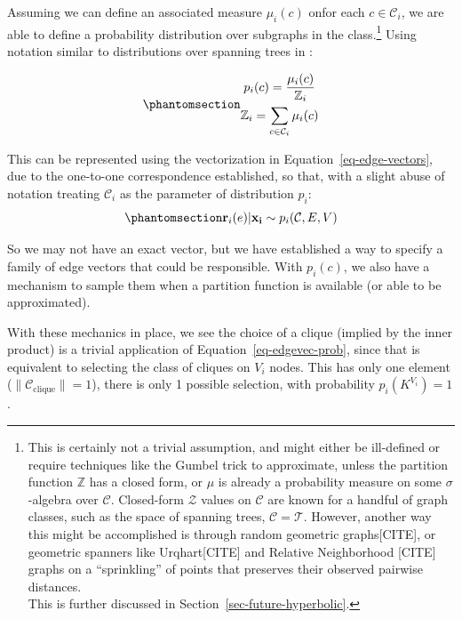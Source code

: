 \documentclass[%
	12pt,
		oneside,
		letterpaper
]{book}
\begin{document}
Assuming we can define an associated measure \(\mu_i(c)\) onfor each
\(c\in\mathcal{C}_i\), we are able to define a probability distribution
over subgraphs in the class.\footnote{ This is certainly not a trivial
  assumption, and might either be ill-defined or require techniques like
  the Gumbel trick\autocite{GradientEstimationStochastic_Paulus2020} to
  approximate, unless the partition function \(\mathbb{Z}\) has a closed
  form, or \(\mu\) is already a probability measure on some
  \(\sigma\)-algebra over \(\mathcal{C}\). Closed-form \(\mathcal{Z}\)
  values on \(\mathcal{C}\) are known for a handful of graph classes,
  such as the space of spanning trees, \(\mathcal{C}=\mathcal{T}\).
  However, another way this might be accomplished is through random
  geometric graphs{[}CITE{]}, or geometric spanners like
  Urqhart{[}CITE{]} and Relative Neighborhood {[}CITE{]} graphs on a
  ``sprinkling'' of points that preserves their observed pairwise
  distances.\\
  This is further discussed in Section~\ref{sec-future-hyperbolic}.}
Using notation similar to distributions over spanning trees in
\textcite{EfficientComputationExpectations_Zmigrod2021}:

\begin{equation}\phantomsection\label{eq-subgraph-prob}{
\begin{gathered}
p_i(c) = \frac{\mu_i(c)}{\mathbb{Z}_i}\\
\mathbb{Z}_i = \sum_{c\in\mathcal{C}_i} \mu_i(c)
\end{gathered}
}\end{equation}

This can be represented using the vectorization in
Equation~\ref{eq-edge-vectors}, due to the one-to-one correspondence
established, so that, with a slight abuse of notation treating
\(\mathcal{C}_i\) as the parameter of distribution \(p_i\):
\begin{equation}\phantomsection\label{eq-edgevec-prob}{
\mathbf{r}_{i}(e)|\mathbf{x_i} \sim p_i(\mathcal{C},E,V)
}\end{equation}

So we may not have an exact vector, but we have established a way to
specify a family of edge vectors that could be responsible. With
\(p_i(c)\), we also have a mechanism to sample them when a partition
function is available (or able to be approximated).

With these mechanics in place, we see the choice of a clique (implied by
the inner product) is a trivial application of
Equation~\ref{eq-edgevec-prob}, since that is equivalent to selecting
the class of cliques on \(V_i\) nodes. This has only one element
(\(\|\mathcal{C}_{\text{clique}}\|=1\)), there is only 1 possible
selection, with probability \(p_i(K^{V_i})=1\).
\end{document}
